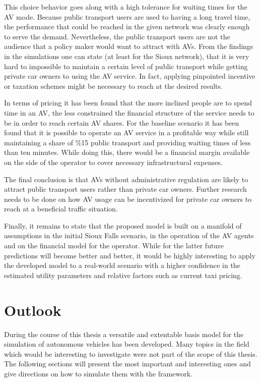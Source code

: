 This choice behavior goes along with a high tolerance for waiting times for the
AV mode. Because public transport users are used to having a long travel time,
the performance that could be reached in the given network was clearly enough
to serve the demand. Nevertheless, the public transport users are not the
audience that a policy maker would want to attract with AVs. From the findings
in the simulations one can state (at least for the Sioux network), that it is
very hard to impossible to maintain a certain level of public transport while
getting private car owners to using the AV service. In fact, applying pinpointed
incentive or taxation schemes might be necessary to reach at the
desired results.

In terms of pricing it has been found that the more inclined people are to spend
time in an AV, the less constrained the financial structure of the service needs
to be in order to reach certain AV shares. For the baseline scenario it has been
found that it is possible to operate an AV service in a profitable way while still
maintaining a share of \%15 public transport and providing waiting times of less
than ten minutes. While doing this, there would be a financial margin available
on the side of the operator to cover necessary infrastructural expenses.

The final conclusion is that AVs without administrative regulation are likely to
attract public transport users rather than private car owners. Further research
needs to be done on how AV usage can be incentivized for private car owners to
reach at a beneficial traffic situation.

Finally, it remains to state that the proposed model is built on a manifold of
assumptions in the initial Sioux Falls scenario, in the operation of the AV
agents and on the financial model for the operator. While for the latter future
predictions will become better and better, it would be highly interesting to apply
the developed model to a real-world scenario with a higher confidence in the estimated
utility parameters and relative factors such as current taxi pricing.

\section{Outlook}
\label{sec:outlook}

During the course of this thesis a versatile and extentable basis model for the
simulation of autonomous vehicles has been developed. Many topics in the field
which would be interesting to investigate were not part of the scope of this thesis.
The following sections will present the most important and interesting ones and
give directions on how to simulate them with the framework.

